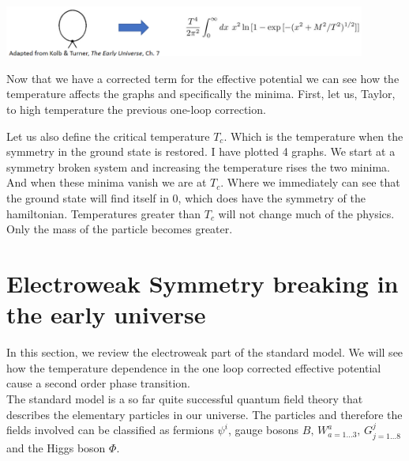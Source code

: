 \documentclass{article}
\numberwithin{equation}{section}
\begin{document}
\begin{center}
\includegraphics[width=450px]{Knipsel4.PNG}    
\end{center}

Now that we have a corrected term for the effective potential we can see how the temperature affects the graphs and specifically the minima.
First, let us, Taylor, to high temperature the previous one-loop correction.

Let us also define the critical temperature $T_c$. 
Which is the temperature when the symmetry in the ground state is restored.
I have plotted 4 graphs.
We start at a symmetry broken system and increasing the temperature rises the two minima.
And when these minima vanish we are at $T_c$.
Where we immediately can see that the ground state will find itself in 0, which does have the symmetry of the hamiltonian.
Temperatures greater than $T_c$ will not change much of the physics. 
Only the mass of the particle becomes greater.

\section{Electroweak Symmetry breaking in the early universe}

In this section, we review the electroweak part of the standard model. We will see how the temperature dependence in the one loop corrected effective potential cause a second order phase transition. \\
\hspace{1cm}
The standard model is a so far quite successful quantum field theory that describes the elementary particles in our universe. 
The particles and therefore the fields involved can be classified as fermions $\psi^{i}$, gauge bosons $B, \,W^{a}_{a = 1\dots 3}, \, G^j_{j = 1\dots 8}$ and the Higgs boson $\Phi$. 
\end{document}
